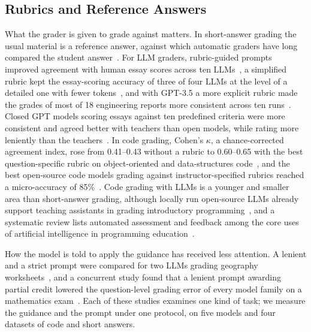 \subsection{Rubrics and Reference Answers}
What the grader is given to grade against matters. In short-answer grading the usual material is a reference
answer, against which automatic graders have long compared the student
answer~\cite{mohler_learning_2011,dzikovska_semeval_2013}. For LLM graders, rubric-guided prompts improved
agreement with human essay scores across ten LLMs~\cite{nugroho_evaluating_2025}, a simplified rubric kept the
essay-scoring accuracy of three of four LLMs at the level of a detailed one with fewer
tokens~\cite{yoshida_detailed_2025}, and with GPT-3.5 a more explicit rubric made the grades of most of 18
engineering reports more consistent across ten runs~\cite{garcia-huertes_leveraging_2024}. Closed GPT models
scoring essays against ten predefined criteria were more consistent and agreed better with teachers than open
models, while rating more leniently than the teachers~\cite{sessler_canai_2025}. In code grading, Cohen's
$\kappa$, a chance-corrected agreement index, rose from 0.41--0.43 without a rubric to 0.60--0.65 with the best
question-specific rubric on object-oriented and data-structures code~\cite{pathak_rubric_2025}, and the best
open-source code models grading against instructor-specified rubrics reached a micro-accuracy of
85\%~\cite{havare_ai-based_2025}. Code grading with LLMs is a younger and smaller area than short-answer grading,
although locally run open-source LLMs already support teaching assistants in grading introductory
programming~\cite{mazzone_exploring_2024}, and a systematic review lists automated assessment and feedback among
the core uses of artificial intelligence in programming education~\cite{manorat_artificial_2025}.

How the model is told to apply the guidance has received less attention. A lenient and a strict prompt were
compared for two LLMs grading geography worksheets~\cite{venkatraman_llmbased_2026}, and a concurrent study found
that a lenient prompt awarding partial credit lowered the question-level grading error of every model family on a
mathematics exam~\cite{sapkota_math_2026}. Each of these studies examines one kind of task; we measure the guidance
and the prompt under one protocol, on five models and four datasets of code and short answers.


